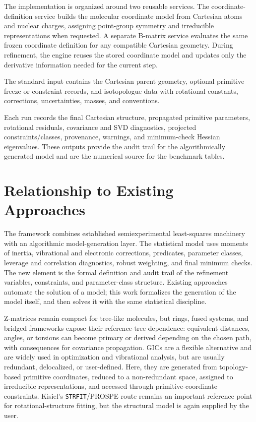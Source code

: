 \documentclass[aip,jcp,reprint,longbibliography,floatfix]{revtex4-2}
\begin{document}
The implementation is organized around two reusable services. The
coordinate-definition service builds the molecular coordinate model from
Cartesian atoms and nuclear charges, assigning point-group symmetry and
irreducible representations when requested. A separate B-matrix service
evaluates the same frozen coordinate definition for any compatible Cartesian
geometry. During refinement, the engine reuses the stored coordinate model
and updates only the derivative information needed for the current step.

The standard input contains the Cartesian parent geometry, optional primitive
freeze or constraint records, and isotopologue data with rotational constants,
corrections, uncertainties, masses, and conventions.

Each run records the final Cartesian structure, propagated primitive
parameters, rotational residuals, covariance and SVD diagnostics, projected
constraints/classes, provenance, warnings, and minimum-check Hessian
eigenvalues. These outputs provide the audit trail for the algorithmically
generated model and are the numerical source for the benchmark tables.


\section{Relationship to Existing Approaches}

The framework combines established semiexperimental least-squares
machinery\cite{Mendolicchio2017MSR,Bartell1975Predicate,Mendolicchio2025FastDvib}
with an algorithmic model-generation layer. The statistical model
uses moments of inertia, vibrational and electronic corrections, predicates,
parameter classes, leverage and correlation diagnostics, robust weighting, and
final minimum checks. The new element is the formal definition and audit
trail of the refinement variables, constraints, and parameter-class structure.
Existing approaches automate the solution of a model; this work formalizes
the generation of the model itself, and then solves it with the same
statistical discipline.

Z-matrices remain compact for tree-like molecules, but rings, fused systems,
and bridged frameworks expose their reference-tree dependence: equivalent
distances, angles, or torsions can become primary or derived depending on the
chosen path, with consequences for covariance propagation. GICs are a flexible
alternative and are widely used in optimization and vibrational
analysis,\cite{Wilson1955,PulayFogarasi1992,Peng1996Redundant,Baker1996Delocalized,BakkenHelgaker2002,Marenich2025GIC}
but are usually redundant, delocalized, or user-defined. Here, they are
generated from topology-based primitive coordinates, reduced to a
non-redundant space, assigned to irreducible representations, and accessed
through primitive-coordinate constraints. Kisiel's \texttt{STRFIT}/PROSPE
route\cite{KisielPROSPE} remains an important reference point for
rotational-structure fitting, but the structural model is again supplied by
the user.\cite{Kanzow2025PCCP}
\end{document}

